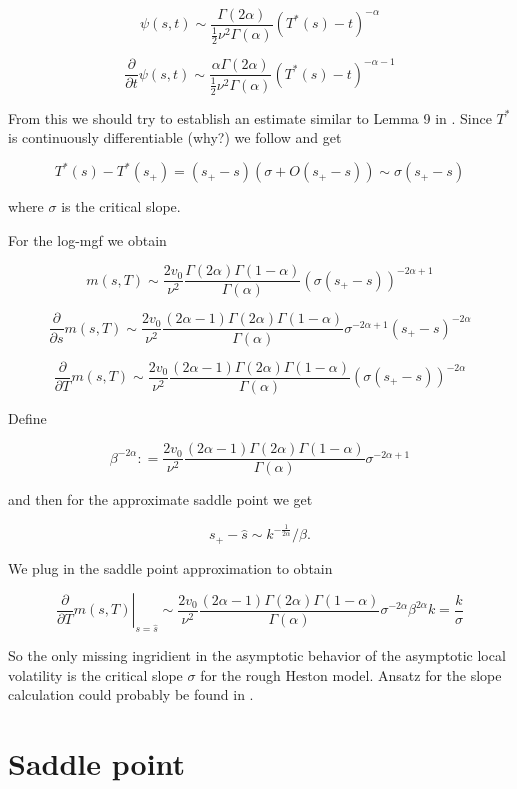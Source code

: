 \documentclass[12pt]{article}
\begin{document}
$$
\psi(s, t) \sim \frac{\Gamma (2\alpha)}{\frac 12 \nu^2 \Gamma(\alpha)} (T^*(s) - t) ^{-\alpha}
$$

$$
\frac{\partial}{\partial t} \psi(s, t) \sim \frac{\alpha \Gamma (2\alpha)}{\frac 12 \nu^2 \Gamma(\alpha)} (T^*(s) - t) ^{-\alpha - 1}
$$


From this we should try to establish an estimate similar to Lemma 9 in \cite{FGGS10}. Since $T^*$ is continuously differentiable (why?) we follow \cite{FGGS10} and get

$$
T ^ { * } ( s ) - T ^ { * } \left( s _ { + } \right) = \left( s _ { + } - s \right) \left( \sigma + O \left( s _ { + } - s \right) \right) \sim \sigma \left( s _ { + } - s \right)
$$

where $\sigma$ is the critical slope.

For the log-mgf we obtain

$$
m(s, T) \sim \frac{2v_0}{\nu^2} \frac{\Gamma(2\alpha)\Gamma(1-\alpha)}{ \Gamma(\alpha)} (\sigma(s_+ - s))^{-2\alpha+1}
$$

$$
\frac{\partial}{\partial s} m(s, T) \sim \frac{2v_0}{\nu^2} \frac{(2\alpha-1)\Gamma(2\alpha)\Gamma(1-\alpha)}{ \Gamma(\alpha)} \sigma ^ {-2\alpha+1}(s_+ - s)^{-2\alpha}
$$

$$
\frac{\partial}{\partial T} m(s, T) \sim \frac{2v_0}{\nu^2} \frac{(2\alpha-1)\Gamma(2\alpha)\Gamma(1-\alpha)}{ \Gamma(\alpha)} (\sigma(s_+ - s))^{-2\alpha}
$$

Define

$$
\beta ^ {-2\alpha}: = \frac{2v_0}{\nu^2} \frac{(2\alpha-1)\Gamma(2\alpha)\Gamma(1-\alpha)}{ \Gamma(\alpha)}\sigma ^ {-2\alpha+1}
$$

and then for the approximate saddle point we get

$$
s_+ - \hat s \sim  k ^{-\frac {1}{2 \alpha}}/\beta.
$$

We plug in the saddle point approximation to obtain

$$
\left.\frac { \partial } { \partial T } m  ( s , T ) \right| _ { s = \hat { s } } \sim \frac{2v_0}{\nu^2} \frac{(2\alpha-1)\Gamma(2\alpha)\Gamma(1-\alpha)}{ \Gamma(\alpha)} \sigma^ {-2\alpha} \beta ^{2\alpha} k = \frac k\sigma
$$

So the only missing ingridient in the asymptotic behavior of the asymptotic local volatility is the critical slope $\sigma$ for the rough Heston model. Ansatz for the slope calculation could probably be found in \cite{K08}.

\section{Saddle point}
\end{document}

